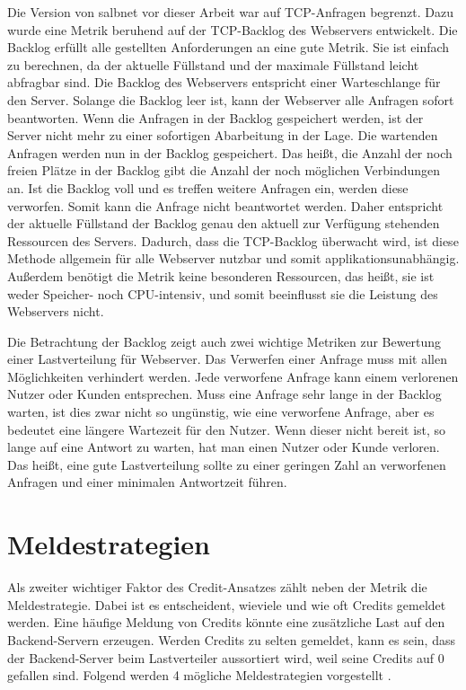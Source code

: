 \documentclass[a4paper, 12pt, BCOR10mm, DIV12, toc=bibliography, toc=listof, german]{scrbook}
\begin{document}
			Die Version von salbnet vor dieser Arbeit war auf TCP-Anfragen begrenzt. Dazu wurde eine
			Metrik beruhend auf der TCP-Backlog des Webservers entwickelt. Die Backlog erfüllt alle
			gestellten Anforderungen an eine gute Metrik. Sie ist einfach zu berechnen, da der aktuelle
			Füllstand und der maximale Füllstand leicht abfragbar sind. Die Backlog des Webservers
			entspricht einer Warteschlange für den Server. Solange die Backlog leer ist, kann der
			Webserver alle Anfragen sofort beantworten. Wenn die Anfragen in der Backlog gespeichert
			werden, ist der Server nicht mehr zu einer sofortigen Abarbeitung in der Lage. Die wartenden
			Anfragen werden nun in der Backlog gespeichert. Das heißt, die Anzahl der noch freien Plätze
			in der Backlog gibt die Anzahl der noch möglichen Verbindungen an. Ist die Backlog voll und es
			treffen weitere Anfragen ein, werden diese verworfen.  Somit kann die Anfrage nicht
			beantwortet werden.  Daher entspricht der aktuelle Füllstand der Backlog genau den aktuell zur
			Verfügung stehenden Ressourcen des Servers. Dadurch, dass die TCP-Backlog überwacht wird, ist
			diese Methode allgemein für alle Webserver nutzbar und somit applikationsunabhängig. Außerdem
			benötigt die Metrik keine besonderen Ressourcen, das heißt, sie ist weder Speicher- noch
			CPU-intensiv, und somit beeinflusst sie die Leistung des Webservers nicht.

			Die Betrachtung der Backlog zeigt auch zwei wichtige Metriken zur Bewertung einer Lastverteilung
			für Webserver. Das Verwerfen einer Anfrage muss mit allen Möglichkeiten verhindert werden. Jede
			verworfene Anfrage kann einem verlorenen Nutzer oder Kunden entsprechen. Muss eine Anfrage sehr
			lange in der Backlog warten, ist dies zwar nicht so ungünstig, wie eine verworfene Anfrage, aber
			es bedeutet eine längere Wartezeit für den Nutzer. Wenn dieser nicht bereit ist, so lange auf eine
			Antwort zu warten, hat man einen Nutzer oder Kunde verloren. Das heißt, eine gute
			Lastverteilung sollte zu einer geringen Zahl an verworfenen Anfragen und einer minimalen
			Antwortzeit führen.


		\section{Meldestrategien} %
		\label{sec:meldestrategien}

			Als zweiter wichtiger Faktor des Credit-Ansatzes zählt neben der Metrik die Meldestrategie. Dabei
			ist es entscheident, wieviele und wie oft Credits gemeldet werden. Eine häufige Meldung von Credits
			könnte eine zusätzliche Last auf den Backend-Servern erzeugen. Werden Credits zu selten
			gemeldet,
			kann es sein, dass der Backend-Server beim Lastverteiler aussortiert wird, weil seine Credits auf
			0 gefallen sind. Folgend werden 4 mögliche Meldestrategien vorgestellt \cite{scsczile2008, schneidenbach2009}.
\end{document}
